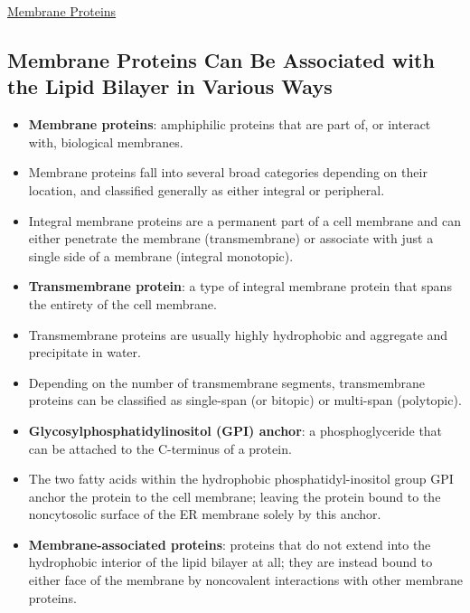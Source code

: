 \documentclass[12pt,letterpaper]{article}
\begin{document}
\hypertarget{10.2}{}
\begin{secbox}{\hyperlink{10}{Membrane Proteins}}{
    \subsection*{Membrane Proteins Can Be Associated with the Lipid Bilayer in Various Ways}
    \begin{itemize}
        \item \textbf{Membrane proteins}: amphiphilic proteins that are part of, or interact with, biological membranes. 
        \item Membrane proteins fall into several broad categories depending on their location, and classified generally as either integral or peripheral.
        \item Integral membrane proteins are a permanent part of a cell membrane and can either penetrate the membrane (transmembrane) or associate with just a single side of a membrane (integral monotopic).
        \item \textbf{Transmembrane protein}: a type of integral membrane protein that spans the entirety of the cell membrane.
        \item Transmembrane proteins are usually highly hydrophobic and aggregate and precipitate in water.
        \item Depending on the number of transmembrane segments, transmembrane proteins can be classified as single-span (or bitopic) or multi-span (polytopic).
        \item \textbf{Glycosylphosphatidylinositol (GPI) anchor}: a phosphoglyceride that can be attached to the C-terminus of a protein.
        \item The two fatty acids within the hydrophobic phosphatidyl-inositol group GPI anchor the protein to the cell membrane; leaving the protein bound to the noncytosolic surface of the ER membrane solely by this anchor.
        \item \textbf{Membrane-associated proteins}: proteins that do not extend into the hydrophobic interior of the lipid bilayer at all; they are instead bound to either face of the membrane by noncovalent interactions with other membrane proteins.\par

\end{itemize}}
\end{secbox}
\end{document}
